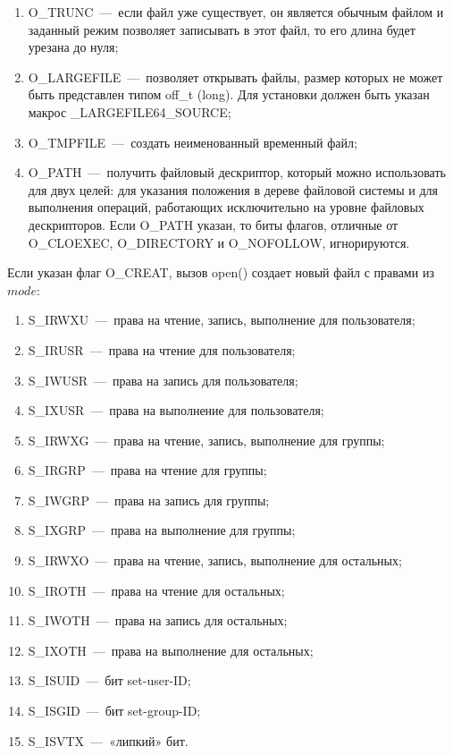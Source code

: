 \begin{enumerate}
	\item O\_TRUNC~---~если файл уже существует, он является обычным файлом и заданный режим позволяет записывать в этот файл, то его длина будет урезана до нуля;
	\item O\_LARGEFILE~---~позволяет открывать файлы, размер которых не может быть представлен типом off\_t (long). Для установки должен быть указан макрос \_LARGEFILE64\_SOURCE;
	\item O\_TMPFILE~---~создать неименованный временный файл;
	\item O\_PATH~---~получить файловый дескриптор, который можно использовать для двух целей: для указания положения в дереве файловой системы и для выполнения операций, работающих исключительно на уровне файловых дескрипторов. Если O\_PATH указан, то биты флагов, отличные от O\_CLOEXEC, O\_DIRECTORY и O\_NOFOLLOW, игнорируются.
\end{enumerate}

Если указан флаг O\_CREAT, вызов open() создает новый файл с правами из  $mode$:

\begin{enumerate}
	\item S\_IRWXU~---~права на чтение, запись, выполнение для пользователя;
	\item S\_IRUSR~---~права на чтение для пользователя;
	\item S\_IWUSR~---~права на запись для пользователя;
	\item S\_IXUSR~---~права на выполнение для пользователя;
	\item S\_IRWXG~---~права на чтение, запись, выполнение для группы;
	\item S\_IRGRP~---~права на чтение для группы;
	\item S\_IWGRP~---~права на запись для группы;
	\item S\_IXGRP~---~права на выполнение для группы;
	\item S\_IRWXO~---~права на чтение, запись, выполнение для остальных;
	\item S\_IROTH~---~права на чтение для остальных;
	\item S\_IWOTH~---~права на запись для остальных;
	\item S\_IXOTH~---~права на выполнение для остальных;
	\item S\_ISUID~---~бит set-user-ID;
	\item S\_ISGID~---~бит set-group-ID;
	\item S\_ISVTX~---~«липкий» бит.
\end{enumerate}


